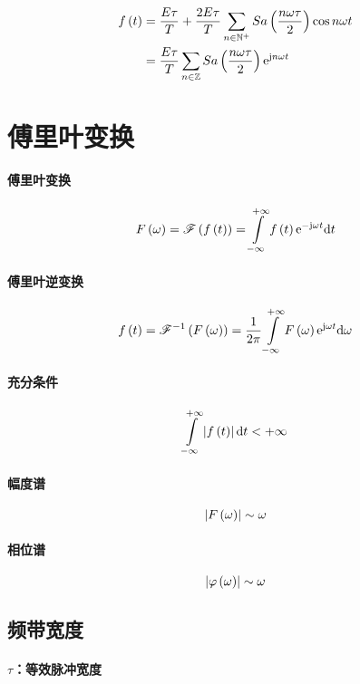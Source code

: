 \documentclass{article}
\begin{document}
\[\begin{aligned}
        f\left(t\right) & =\frac{E\tau}T+\frac{2E\tau}T\sum_{n\in\mathbb N^+}Sa\left(\frac{n\omega\tau}2\right)\cos n\omega t \\
            & =\frac{E\tau}T\sum_{n\in\mathbb Z} Sa\left(\frac{n\omega\tau}2\right)\mathrm e^{\mathrm j n\omega t}
    \end{aligned}\]

\section{傅里叶变换}

\paragraph{傅里叶变换}

\[F\pare{\omega}=\fourier\ft=\impint\ft\e^{-\j\omega t}\d t\]

\paragraph{傅里叶逆变换}

\[\ft=\ifourier{F\pare{\omega}}=\frac1{2\pi}\impint F\pare{\omega}\e^{\j\omega t}\d\omega\]

\paragraph{充分条件}

\[\impint\abs\ft\d t<+\infty\]

\paragraph{幅度谱}

\[\left|F\left(\omega\right)\right|\sim \omega\]

\paragraph{相位谱}

\[\left|\varphi\left(\omega\right)\right|\sim \omega\]

\subsection{频带宽度}

\paragraph{$\tau$：等效脉冲宽度}
\end{document}
